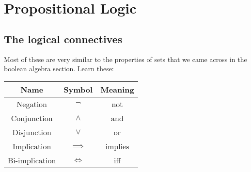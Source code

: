 
\section{Propositional Logic}

\subsection{The logical connectives}

Most of these are very similar to the properties of sets that we came across in
the boolean algebra section. Learn these:

\begin{center}
	\begin{tabular}{|c|c|c|}
		\hline
		Name & Symbol & Meaning\\ \hline
		Negation		&	$\neg$		& not\\
		Conjunction		&	$\wedge$	& and\\
		Disjunction		&	$\vee$		& or\\
		Implication		&	$\implies$	& implies\\
		Bi-implication	&	$\iff$		& iff\\
		\hline
	\end{tabular}
\end{center}


